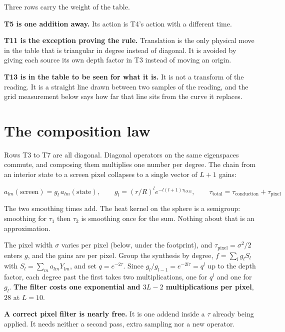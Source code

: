 Three rows carry the weight of the table.

\textbf{T5 is one addition away.} Its action is T4's action with a different time.

\textbf{T11 is the exception proving the rule.} Translation is the only physical move in the table that is triangular in degree instead of diagonal. It is avoided by giving each source its own depth factor in T3 instead of moving an origin.

\textbf{T13 is in the table to be seen for what it is.} It is not a transform of the reading. It is a straight line drawn between two samples of the reading, and the grid measurement below says how far that line sits from the curve it replaces.

\section{The composition law}

Rows T3 to T7 are all diagonal. Diagonal operators on the same eigenspaces commute, and composing them multiplies one number per degree. The chain from an interior state to a screen pixel collapses to a single vector of \(L+1\) gains:

\begin{center}
\(a_{lm}(\text{screen}) = g_l\, a_{lm}(\text{state}), \qquad g_l = (r/R)^l e^{-l(l+1)\tau_{\text{total}}}, \qquad \tau_{\text{total}} = \tau_{\text{conduction}} + \tau_{\text{pixel}}\)
\end{center}

The two smoothing times add. The heat kernel on the sphere is a semigroup: smoothing for \(\tau_1\) then \(\tau_2\) is smoothing once for the sum. Nothing about that is an approximation.

The pixel width \(\sigma\) varies per pixel (below, under the footprint), and \(\tau_{\text{pixel}} = \sigma^2/2\) enters \(g\), and the gains are per pixel. Group the synthesis by degree, \(f = \sum_l g_l S_l\) with \(S_l = \sum_m a_{lm} Y_{lm}\), and set \(q = e^{-2\tau}\). Since \(g_l / g_{l-1} = e^{-2l\tau} = q^l\) up to the depth factor, each degree past the first takes two multiplications, one for \(q^l\) and one for \(g_l\). \textbf{The filter costs one exponential and \(3L - 2\) multiplications per pixel}, \(28\) at \(L = 10\).

\textbf{A correct pixel filter is nearly free.} It is one addend inside a \(\tau\) already being applied. It needs neither a second pass, extra sampling nor a new operator.

